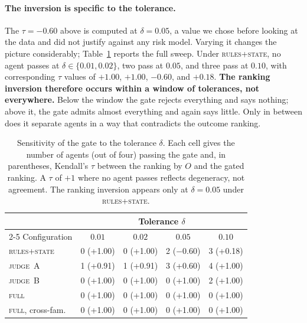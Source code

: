 \documentclass{article}
\begin{document}
\paragraph{The inversion is specific to the tolerance.}
The $\tau=-0.60$ above is computed at $\delta=0.05$, a value we chose before looking at the data and did not justify against any risk model. Varying it changes the picture considerably; Table~\ref{tab:delta} reports the full sweep. Under \textsc{rules+state}, no agent passes at $\delta\in\{0.01,0.02\}$, two pass at $0.05$, and three pass at $0.10$, with corresponding $\tau$ values of $+1.00$, $+1.00$, $-0.60$, and $+0.18$. \textbf{The ranking inversion therefore occurs within a window of tolerances, not everywhere.} Below the window the gate rejects everything and says nothing; above it, the gate admits almost everything and again says little. Only in between does it separate agents in a way that contradicts the outcome ranking.

\begin{table}[t]
\caption{Sensitivity of the gate to the tolerance $\delta$. Each cell gives the number of agents (out of four) passing the gate and, in parentheses, Kendall's $\tau$ between the ranking by $O$ and the gated ranking. A $\tau$ of $+1$ where no agent passes reflects degeneracy, not agreement. The ranking inversion appears only at $\delta=0.05$ under \textsc{rules+state}.}
\label{tab:delta}
\vskip 0.1in
\begin{center}\begin{small}
\setlength{\tabcolsep}{3pt}
\begin{tabular}{lcccc}
\toprule
 & \multicolumn{4}{c}{Tolerance $\delta$} \\
\cmidrule(l){2-5}
Configuration & $0.01$ & $0.02$ & $0.05$ & $0.10$ \\
\midrule
\textsc{rules+state} & 0 (+1.00) & 0 (+1.00) & 2 ($-$0.60) & 3 (+0.18) \\
\textsc{judge~A}     & 1 (+0.91) & 1 (+0.91) & 3 (+0.60) & 4 (+1.00) \\
\textsc{judge~B}     & 0 (+1.00) & 0 (+1.00) & 0 (+1.00) & 2 (+1.00) \\
\textsc{full}        & 0 (+1.00) & 0 (+1.00) & 0 (+1.00) & 0 (+1.00) \\
\textsc{full}, cross-fam. & 0 (+1.00) & 0 (+1.00) & 0 (+1.00) & 0 (+1.00) \\
\bottomrule
\end{tabular}
\end{small}\end{center}
\vskip -0.1in
\end{table}
\end{document}
